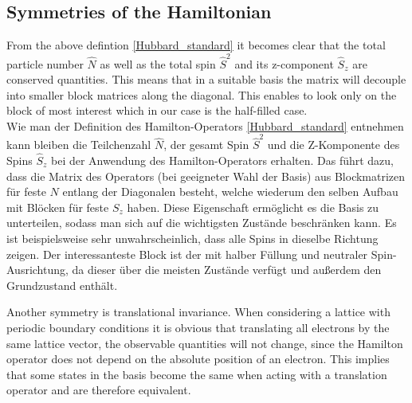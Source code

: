 
\subsection{Symmetries of the Hamiltonian}
From the above defintion \eqref{Hubbard_standard} it becomes clear that the total particle number $ \hat{N} $ as well as the total spin $ \hat{S}^2 $ and its z-component $ \hat{S}_z $ are conserved quantities. This means that in a suitable basis the matrix will decouple into smaller block matrices along the diagonal. This enables to look only on the block of most interest which in our case is the half-filled case. \\

Wie man der Definition des Hamilton-Operators \eqref{Hubbard_standard} entnehmen kann bleiben die Teilchenzahl $ \hat{N} $, der gesamt Spin $ \hat{S}^2 $ und die Z-Komponente des Spins $ \hat{S}_z $ bei der Anwendung des Hamilton-Operators erhalten. Das führt dazu, dass die Matrix des Operators (bei geeigneter Wahl der Basis) aus Blockmatrizen für feste $ N $ entlang der Diagonalen besteht, welche wiederum den selben Aufbau mit Blöcken für feste $ S_z $ haben. Diese Eigenschaft ermöglicht es die Basis zu unterteilen, sodass man sich auf die wichtigsten Zustände beschränken kann. Es ist beispielsweise sehr unwahrscheinlich, dass alle Spins in dieselbe Richtung zeigen. Der interessanteste Block ist der mit halber Füllung und neutraler Spin-Ausrichtung, da dieser über die meisten Zustände verfügt und außerdem den Grundzustand enthält.

Another symmetry is translational invariance. When considering a lattice with periodic boundary conditions it is obvious that translating all electrons by the same lattice vector, the observable quantities will not change, since the Hamilton operator does not depend on the absolute position of an electron. This implies that some states in the basis become the same when acting with a translation operator and are therefore equivalent.\\

